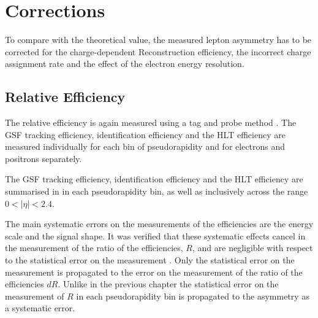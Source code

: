 \section{Corrections}

To compare with the theoretical value, the measured lepton asymmetry has to be
corrected for the charge-dependent Reconstruction efficiency, the incorrect charge
assignment rate and the effect of the electron energy resolution.

\subsection{Relative Efficiency}
The relative efficiency is again measured using a tag and probe method \cite{adam2009tag}.
The {GSF} tracking efficiency,
identification efficiency and the {HLT} efficiency are measured individually
for each bin of pseudorapidity and for electrons and positrons separately. 

The {GSF} tracking efficiency, identification efficiency and the {HLT}
efficiency are summarised in 
in each pseudorapidity bin, as well as inclusively
across the range $0<| \eta |< 2.4$. 

The main systematic errors on the measurements of the efficiencies are the
energy scale and the signal shape. It was verified that these systematic effects
cancel in the measurement of the ratio of the efficiencies, $R$, and are
negligible with respect to the statistical error on the measurement
\cite{bendavid2011electron} .  Only the statistical error on the measurement is
propagated to the error on the measurement of the ratio of the efficiencies
$dR$.  Unlike in the previous chapter the statistical error on the measurement
of $R$ in each pseudorapidity bin is propagated to the asymmetry as a systematic
error. 

